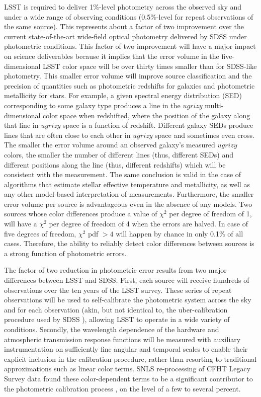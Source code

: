 \documentclass[12pt,preprint]{aastex}
\begin{document}
LSST is required to deliver 1\%-level photometry across the observed
sky and under a wide range of observing conditions (0.5\%-level for
repeat observations of the same source). This represents about a
factor of two improvement over the current state-of-the-art wide-field
optical photometry delivered by SDSS under photometric
conditions. This factor of two improvement will have a major impact on
science deliverables because it implies that the error volume in the
five-dimensional LSST color space will be over thirty times smaller
than for SDSS-like photometry. This smaller error volume will improve
source classification and the precision of quantities such as
photometric redshifts for galaxies and photometric metallicity for
stars.  For example, a given spectral energy distribution (SED)
corresponding to some galaxy type produces a line in the $ugrizy$
multi-dimensional color space when redshifted, where the position of
the galaxy along that line in $ugrizy$ space is a function of
redshift. Different galaxy SEDs produce lines that are often close to
each other in $ugrizy$ space and sometimes even cross. The smaller the
error volume around an observed galaxy's measured $ugrizy$ colors, the
smaller the number of different lines (thus, different SEDs) and
different positions along the line (thus, different redshifts) which
will be consistent with the measurement. The same conclusion is valid
in the case of algorithms that estimate stellar effective temperature
and metallicity, as well as any other model-based interpretation of
measurements. Furthermore, the smaller error volume per source is
advantageous even in the absence of any models. Two sources whose
color differences produce a value of $\chi^2$ per degree of freedom of
1, will have a $\chi^2$ per degree of freedom of 4 when the errors are
halved. In case of five degrees of freedom, $\chi^2$ pdf $>4$ will
happen by chance in only 0.1\% of all cases. Therefore, the ability to
reliably detect color differences between sources is a strong function
of photometric errors.

The factor of two reduction in photometric error results from two major differences
between LSST and SDSS. First, each source will receive hundreds of
observations over the ten years of the LSST survey. These series of
repeat observations will be used to self-calibrate the photometric
system across the sky and for each observation (akin, but not
identical to, the uber-calibration procedure used by SDSS
\citep{Padmanabhan2008}), allowing LSST to operate in a wide variety
of conditions. Secondly, the wavelength dependence of the hardware and
atmospheric transmission response functions will be measured with
auxiliary instrumentation on sufficiently fine angular and temporal
scales to enable their explicit inclusion in the calibration
procedure, rather than resorting to traditional approximations such as
linear color terms. SNLS re-processing of CFHT Legacy Survey data
found these color-dependent terms to be a significant contributor to
the photometric calibration process \citep{Regnault2009}, on
the level of a few to several percent. 
\end{document}

